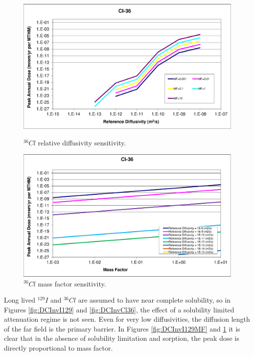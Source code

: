 \begin{figure}[ht]
\begin{minipage}[b]{0.45\linewidth}

\includegraphics[width=\linewidth]{./chapters/nuclide_sensitivity/clay/DiffCoeffAndInvEBSFail/Cl-36.eps}
\caption{$^{36}Cl$ relative diffusivity sensitivity.}
\label{fig:DCInvCl36}

\end{minipage}
\hspace{0.05\linewidth}
\begin{minipage}[b]{0.45\linewidth}

\includegraphics[width=\linewidth]{./chapters/nuclide_sensitivity/clay/DiffCoeffAndInvEBSFail/Cl-36-MF.eps}
\caption{$^{36}Cl$ mass factor sensitivity.}
\label{fig:DCInvCl36MF}

\end{minipage}
\end{figure}

Long lived $^{129}I$ and $^{36}Cl$ are assumed to have near complete solubility, 
so in Figures \ref{fig:DCInvI129} and \ref{fig:DCInvCl36}, the effect of a 
solubility limited attenuation regime is not seen. Even for very low 
diffusivities, the diffusion length of the far field is the primary barrier. In 
Figures \ref{fig:DCInvI129MF} and \ref{fig:DCInvCl36MF} it is clear that in the 
absence of solubility limitation and sorption, the peak dose is directly 
proportional to mass factor. 

